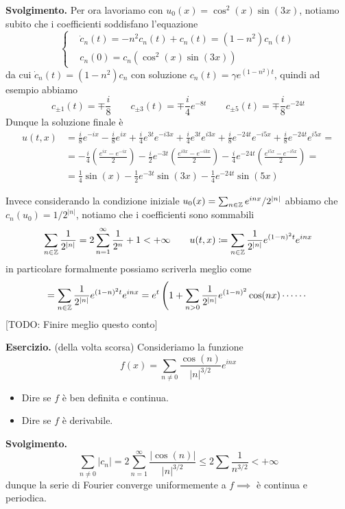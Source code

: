 \textbf{Svolgimento.}
Per ora lavoriamo con $u_0(x) = \cos^2(x) \sin(3x)$, notiamo subito che i coefficienti soddisfano l'equazione
$$
\left\{
\begin{aligned}
	& \dot c_n(t) = -n^2 c_n(t) + c_n(t) = (1 - n^2) c_n(t) \\
	& c_n(0) = c_n(\cos^2(x) \sin(3x))
\end{aligned}
\right.
$$
da cui $\dot c_n(t) = (1 - n^2)c_n$ con soluzione $c_n(t) = \gamma e^{(1 - n^2) t}$, quindi ad esempio abbiamo
$$
c_{\pm 1}(t) = \mp \frac{i}{8}
\qquad
c_{\pm 3}(t) = \mp \frac{i}{4} e^{-8t}
\qquad
c_{\pm 5}(t) = \mp \frac{i}{8} e^{-24t}
$$
Dunque la soluzione finale è
$$
\begin{aligned}
	u(t, x) 
	&= \frac{i}{8} e^{-ix} -\frac{i}{8} e^{ix} + \frac{i}{4}e^{3t} e^{-i3x} + \frac{i}{4}e^{3t} e^{i3x} + \frac{i}{8} e^{-24t} e^{-i5x} + \frac{i}{8} e^{-24 t} e^{i5x} = \\
	&= 
	-\frac{i}{4} \left( \frac{e^{ix} - e^{-ix}}{2} \right)
	-\frac{i}{2} e^{-3t} \left( \frac{e^{i3x} - e^{-i3x}}{2} \right)
	-\frac{i}{4} e^{-24t} \left( \frac{e^{i5x} - e^{-i5x}}{2} \right) = \\
	&= 
	\frac{1}{4} \sin(x) 
	- \frac{1}{2} e^{-3t} \sin(3x)
	- \frac{1}{4} e^{-24t} \sin(5x)
\end{aligned}
$$

Invece considerando la condizione iniziale $u_0(x) = \sum_{n \in \mathbb Z} e^{inx} / 2^{|n|}$ abbiamo che $c_n(u_0) = 1 / 2^{|n|}$, notiamo che i coefficienti sono sommabili
$$
\sum_{n \in \mathbb Z} \frac{1}{2^{|n|}} 
= 2 \sum_{n=1}^\infty \frac{1}{2^n} + 1 < +\infty
\qquad
u(t, x) \coloneqq \sum_{n \in \mathbb Z} \frac{1}{2^{|n|}} e^{(1 - n)^2 t} e^{inx}
$$
in particolare formalmente possiamo scriverla meglio come
$$
= \sum_{n \in \mathbb Z} \frac{1}{2^{|n|}} e^{(1 - n)^2 t} e^{inx}
= e^t \left(1 + \sum_{n > 0} \frac{1}{2^{|n|}} e^{(1 - n)^2} \cos(nx) \cdots\cdots \right.
$$
[TODO: Finire meglio questo conto]

\textbf{Esercizio.} (della volta scorsa)
Consideriamo la funzione
$$
f(x) = \sum_{n \neq 0} \frac{\cos(n)}{|n|^{3/2}} e^{inx}
$$
\begin{itemize}
	\item Dire se $f$ è ben definita e continua.
	\item Dire se $f$ è derivabile.
\end{itemize}

\textbf{Svolgimento.}
$$
\sum_{n \neq 0} |c_n| 
= 2 \sum_{n=1}^\infty \frac{|\cos(n)|}{|n|^{3/2}}
\leq 2 \sum \frac{1}{n^{3/2}} < +\infty
$$
dunque la serie di Fourier converge uniformemente a $f \implies$ è continua e periodica.

